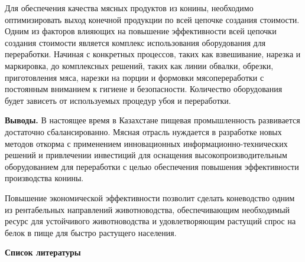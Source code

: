 \begin{multicols}{2}
Для обеспечения качества мясных продуктов из конины, необходимо
оптимизировать выход конечной продукции по всей цепочке создания
стоимости. Одним из факторов влияющих на повышение эффективности всей
цепочки создания стоимости является комплекс использования оборудования
для переработки. Начиная с конкретных процессов, таких как взвешивание,
нарезка и маркировка, до комплексных решений, таких как линии обвалки,
обрезки, приготовления мяса, нарезки на порции и формовки
мясопереработки с постоянным вниманием к гигиене и безопасности.
Количество оборудования будет зависеть от используемых процедур убоя и
переработки.

{\bfseries Выводы.} В настоящее время в Казахстане пищевая промышленность
развивается достаточно сбалансированно. Мясная отрасль нуждается в
разработке новых методов откорма с применением инновационных
информационно-технических решений и привлечении инвестиций для оснащения
высокопроизводительным оборудованием для переработки с целью обеспечения
повышения эффективности производства конины.

Повышение экономической эффективности позволит сделать коневодство одним
из рентабельных направлений животноводства, обеспечивающим необходимый
ресурс для устойчивого животноводства и удовлетворяющим растущий спрос
на белок в пище для быстро растущего населения.
\end{multicols}


\begin{center}
	{\bfseries Список литературы}
\end{center}

